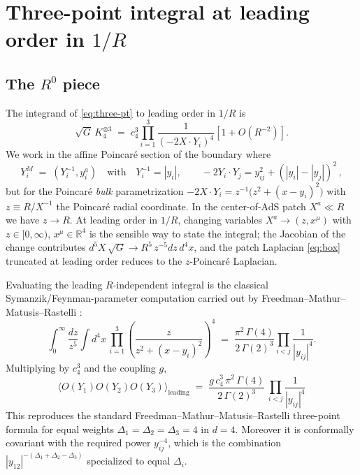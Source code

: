 \documentclass[11pt]{article}
\begin{document}
\section{Three-point integral at leading order in \texorpdfstring{$1/R$}{1/R}}\label{sec:threept}

\subsection{The \texorpdfstring{$R^0$}{R^0} piece}

The integrand of \cref{eq:three-pt} to leading order in $1/R$ is
\begin{equation}
    \sqrt{G}\,K_4^{\otimes 3} \;=\; c_4^3\prod_{i=1}^{3}\frac{1}{(-2X\cdot Y_i)^4}\left[1 + O(R^{-2})\right].
\end{equation}
We work in the affine Poincar\'e section of the boundary where
\begin{equation}
    Y^M_i \;=\; (Y^{-1}_i, y^a_i)\quad\text{with}\quad Y^{-1}_i = |y_i|,\qquad -2Y_i\cdot Y_j = y_{ij}^2 + (|y_i|-|y_j|)^2\,,
\end{equation}
but for the Poincar\'e \emph{bulk} parametrization $-2X\cdot Y_i = z^{-1}\bigl(z^2 + (x-y_i)^2\bigr)$ with $z\equiv R/X^{-1}$ the Poincar\'e radial coordinate. In the center-of-AdS patch $X^a\ll R$ we have $z\to R$. At leading order in $1/R$, changing variables $X^a \to (z,x^\mu)$ with $z\in[0,\infty)$, $x^\mu\in\mathbb{R}^4$ is the sensible way to state the integral; the Jacobian of the change contributes $d^5X\,\sqrt{G}\to R^5\, z^{-5}dz\,d^4x$, and the patch Laplacian \cref{eq:box} truncated at leading order reduces to the $z$-Poincar\'e Laplacian.

Evaluating the leading $R$-independent integral is the classical Symanzik/Feynman-parameter computation carried out by Freedman--Mathur--Matusis--Rastelli \cite{Freedman:1998tz}:
\begin{equation}
    \int_0^\infty\!\!\!\frac{dz}{z^5}\!\int\! d^4x\,\prod_{i=1}^{3}\!\left(\frac{z}{z^2+(x-y_i)^2}\right)^{\!4} \;=\; \frac{\pi^{2}\,\Gamma(4)}{2\,\Gamma(2)^3}\prod_{i<j}\frac{1}{|y_{ij}|^{4}}.
    \label{eq:flatint}
\end{equation}
Multiplying by $c_4^3$ and the coupling $g$,
\begin{equation}
    \boxed{\;\langle O(Y_1) O(Y_2) O(Y_3)\rangle_{\text{leading}} \;=\; \frac{g\,c_4^3\,\pi^2\,\Gamma(4)}{2\,\Gamma(2)^3}\,\prod_{i<j}\frac{1}{|y_{ij}|^{4}}\;}
    \label{eq:C123}
\end{equation}
This reproduces the standard Freedman--Mathur--Matusis--Rastelli three-point formula for equal weights $\Delta_1=\Delta_2=\Delta_3=4$ in $d=4$. Moreover it is conformally covariant with the required power $y_{ij}^{-4}$, which is the combination $|y_{12}|^{-(\Delta_1+\Delta_2-\Delta_3)}$ specialized to equal $\Delta_i$.
\end{document}
